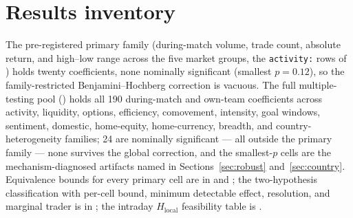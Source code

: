 \documentclass[12pt]{article}
\begin{document}
\section{Results inventory}\label{app:inventory}
The pre-registered primary family (during-match volume, trade count, absolute return, and high--low range
across the five market groups, the \texttt{activity:} rows of ) holds twenty
coefficients, none nominally significant (smallest $p=0.12$), so the family-restricted Benjamini--Hochberg
correction is vacuous. The full multiple-testing pool () holds all 190 during-match and
own-team coefficients across activity, liquidity, options, efficiency, comovement, intensity, goal windows,
sentiment, domestic, home-equity, home-currency, breadth, and country-heterogeneity families; 24 are
nominally significant --- all outside the primary family --- none survives the global correction, and the
smallest-$p$ cells are the mechanism-diagnosed artifacts named in Sections~\ref{sec:robust} and~\ref{sec:country}. Equivalence bounds for every primary cell are in  and
; the two-hypothesis classification with per-cell bound, minimum detectable
effect, resolution, and marginal trader is in ; the intraday $H_{\text{local}}$
feasibility table is .
\end{document}

